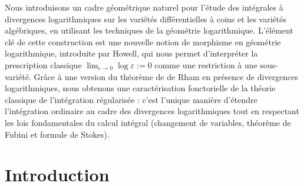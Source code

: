\documentclass[JEP,XML,SOM,Unicode,NoFloatCountersInSection,published]{cedram}
\theoremstyle{definition}
\theoremstyle{remark}
\begin{document}




\begin{altabstract}
Nous introduisons un cadre géométrique naturel pour l’étude des intégrales à divergences logarithmiques sur les variétés différentielles à coins et les variétés algébriques, en utilisant les techniques de la géométrie logarithmique. L’élément clé de cette construction est une nouvelle notion de morphisme en géométrie logarithmique, introduite par Howell, qui nous permet d’interpréter la prescription classique \og $\lim_{\varepsilon\to 0} \log \varepsilon := 0$ \fg{} comme une restriction à une sous-variété. Grâce à une version du théorème de de Rham en présence de divergences logarithmiques, nous obtenons une caractérisation fonctorielle de la théorie classique de l’\og intégration régularisée \fg{} : c’est l’unique manière d’étendre l’intégration ordinaire au cadre des divergences logarithmiques tout en respectant les lois fondamentales du calcul intégral (changement de \hbox{variables}, théorème de Fubini et formule de Stokes).
\end{altabstract}

\maketitle
\vspace*{-\baselineskip}
\tableofcontents
\mainmatter

\section{Introduction}
\end{document}
